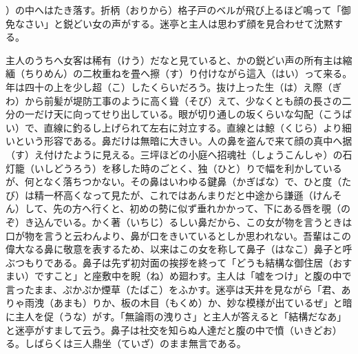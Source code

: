 \documentclass{book}
\begin{document}
）の中へはたき落す。折柄（おりから）格子戸のベルが飛び上るほど鳴って「御免なさい」と鋭どい女の声がする。迷亭と主人は思わず顔を見合わせて沈黙する。

主人のうちへ女客は稀有（けう）だなと見ていると、かの鋭どい声の所有主は縮緬（ちりめん）の二枚重ねを畳へ擦（す）り付けながら這入（はい）って来る。年は四十の上を少し超（こ）したくらいだろう。抜け上った生（は）え際（ぎわ）から前髪が堤防工事のように高く聳（そび）えて、少なくとも顔の長さの二分の一だけ天に向ってせり出している。眼が切り通しの坂くらいな勾配（こうばい）で、直線に釣るし上げられて左右に対立する。直線とは鯨（くじら）より細いという形容である。鼻だけは無暗に大きい。人の鼻を盗んで来て顔の真中へ据（す）え付けたように見える。三坪ほどの小庭へ招魂社（しょうこんしゃ）の石灯籠（いしどうろう）を移した時のごとく、独（ひと）りで幅を利かしているが、何となく落ちつかない。その鼻はいわゆる鍵鼻（かぎばな）で、ひと度（たび）は精一杯高くなって見たが、これではあんまりだと中途から謙遜（けんそん）して、先の方へ行くと、初めの勢に似ず垂れかかって、下にある唇を覗（のぞ）き込んでいる。かく著（いちじ）るしい鼻だから、この女が物を言うときは口が物を言うと云わんより、鼻が口をきいているとしか思われない。吾輩はこの偉大なる鼻に敬意を表するため、以来はこの女を称して鼻子（はなこ）鼻子と呼ぶつもりである。鼻子は先ず初対面の挨拶を終って「どうも結構な御住居（おすまい）ですこと」と座敷中を睨（ね）め廻わす。主人は「嘘をつけ」と腹の中で言ったまま、ぷかぷか煙草（たばこ）をふかす。迷亭は天井を見ながら「君、ありゃ雨洩（あまも）りか、板の木目（もくめ）か、妙な模様が出ているぜ」と暗に主人を促（うな）がす。「無論雨の洩りさ」と主人が答えると「結構だなあ」と迷亭がすまして云う。鼻子は社交を知らぬ人達だと腹の中で憤（いきどお）る。しばらくは三人鼎坐（ていざ）のまま無言である。
\end{document}
